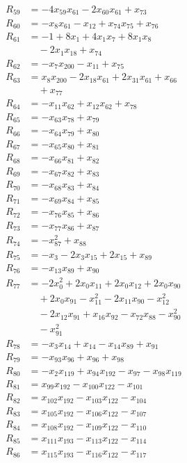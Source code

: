 \begin{align*}
R_{59}&=-4x_{59}x_{61}-2x_{60}x_{61}+x_{73}\\
R_{60}&=-x_{8}x_{61}-x_{12}+x_{74}x_{75}+x_{76}\\
R_{61}&=-1+8x_{1}+4x_{1}x_{7}+8x_{1}x_{8}\\
&\quad{}-2x_{1}x_{18}+x_{74}\\
R_{62}&=-x_{7}x_{200}-x_{11}+x_{75}\\
R_{63}&=x_{8}x_{200}-2x_{18}x_{61}+2x_{31}x_{61}+x_{66}\\
&\quad{}+x_{77}\\
R_{64}&=-x_{11}x_{62}+x_{12}x_{62}+x_{78}\\
R_{65}&=-x_{63}x_{78}+x_{79}\\
R_{66}&=-x_{64}x_{79}+x_{80}\\
R_{67}&=-x_{65}x_{80}+x_{81}\\
R_{68}&=-x_{66}x_{81}+x_{82}\\
R_{69}&=-x_{67}x_{82}+x_{83}\\
R_{70}&=-x_{68}x_{83}+x_{84}\\
R_{71}&=-x_{69}x_{84}+x_{85}\\
R_{72}&=-x_{76}x_{85}+x_{86}\\
R_{73}&=-x_{77}x_{86}+x_{87}\\
R_{74}&=-x_{87}^{2}+x_{88}\\
R_{75}&=-x_{3}-2x_{3}x_{15}+2x_{15}+x_{89}\\
R_{76}&=-x_{13}x_{89}+x_{90}\\
R_{77}&=-2x_{0}^{2}+2x_{0}x_{11}+2x_{0}x_{12}+2x_{0}x_{90}\\
&\quad{}+2x_{0}x_{91}-x_{11}^{2}-2x_{11}x_{90}-x_{12}^{2}\\
&\quad{}-2x_{12}x_{91}+x_{16}x_{92}-x_{72}x_{88}-x_{90}^{2}\\
&\quad{}-x_{91}^{2}\\
R_{78}&=-x_{3}x_{14}+x_{14}-x_{14}x_{89}+x_{91}\\
R_{79}&=-x_{93}x_{96}+x_{96}+x_{98}\\
R_{80}&=-x_{2}x_{119}+x_{94}x_{192}-x_{97}-x_{98}x_{119}\\
R_{81}&=x_{99}x_{192}-x_{100}x_{122}-x_{101}\\
R_{82}&=x_{102}x_{192}-x_{103}x_{122}-x_{104}\\
R_{83}&=x_{105}x_{192}-x_{106}x_{122}-x_{107}\\
R_{84}&=x_{108}x_{192}-x_{109}x_{122}-x_{110}\\
R_{85}&=x_{111}x_{193}-x_{113}x_{122}-x_{114}\\
R_{86}&=x_{115}x_{193}-x_{116}x_{122}-x_{117}\\

\end{align*}
